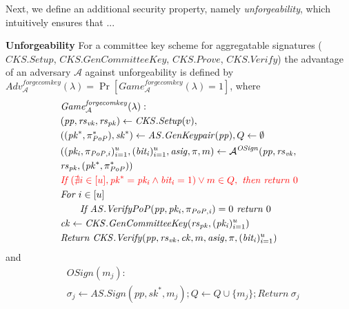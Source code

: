 \noindent Next, we define an additional security property, namely \emph{unforgeability}, {\color{red} which intuitively ensures that 
...}\\
\vspace{-0.05in}

\noindent \textbf{Unforgeability}  For a committee key scheme for aggregatable signatures 
($\mathit{CKS.Setup}$, $\mathit{CKS.GenCommitteeKey}$, $\mathit{CKS.Prove}$, 
$\mathit{CKS.Verify}$) the advantage of an 
adversary $\mathcal{A}$ against unforgeability is defined by \\
$\mathit{Adv}_{\mathcal{A}}^{\mathit{forgecomkey}}(\lambda) = \Pr[\mathit{Game}^{\mathit{forgecomkey}}_{\mathcal{A}}(\lambda) = 1]$, 
where
\begin{align*}
&\mathit{Game}^{\mathit{forgecomkey}}_{\mathcal{A}}({\lambda}): \\
& (\mathit{pp}, \mathit{rs}_{\mathit{vk}},\mathit{rs}_{\mathit{pk}}) \leftarrow \mathit{CKS.Setup}(v), \\
&((\mathit{pk}^*,\pi^*_{\mathit{PoP}}), \mathit{sk}^*) \leftarrow \mathit{AS.GenKeypair}(\mathit{pp}), Q \leftarrow \emptyset \\
& ((\mathit{pk_i}, \pi_{\mathit{PoP},i})_{i=1}^{u}, (\mathit{bit_i})_{i=1}^u, \mathit{asig}, \pi, m) \leftarrow \mathcal{A}^{\mathit{OSign}}(\mathit{pp},\mathit{rs}_{\mathit{vk}}, \\ &\mathit{rs}_{\mathit{pk}}, (\mathit{pk^*},\pi^*_{\mathit{PoP}})) \\
&{\color{red} \textit{If } (\nexists i  \in [u], \mathit{pk}^* = \mathit{pk_i} \wedge \mathit{bit_i}=1) \vee m \in Q, \textit{ then return } 0} \\
& \textit{For } i \in [u] \\
& \ \ \ \ \ \textit{ If } \mathit{AS.VerifyPoP}(\mathit{pp}, \mathit{pk_i}, \pi_{\mathit{PoP,i}})=0  \textit{ return } 0 \\
& \mathit{ck} \leftarrow \mathit{CKS.GenCommitteeKey}(\mathit{rs}_{\mathit{pk}}, (\mathit{pk_i})_{i=1}^u) \\
& \textit{Return } \mathit{CKS.Verify}(\mathit{pp}, \mathit{rs}_{\mathit{vk}},  \mathit{ck}, m, \mathit{asig}, \pi, (\mathit{bit_i})_{i=1}^u)
\end{align*}
and 
\begin{align*}
& \mathit{OSign}(m_j): \\
& \sigma_j \leftarrow \mathit{AS.Sign}(\mathit{pp}, \mathit{sk}^*, m_j); Q \leftarrow Q \cup \{m_j\}; \textit{Return} \ \sigma_j
\end{align*}


